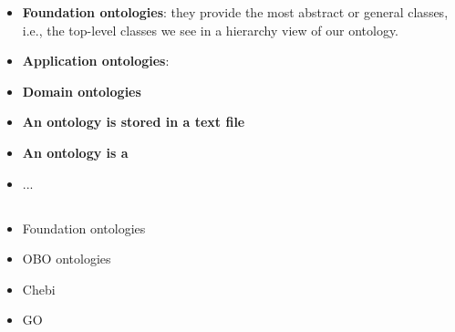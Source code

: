 \documentclass[english, xcolor=dvipsnames, aspectratio=169]{beamer}
\newcommand{\subsectiontitle}{}
\begin{document}
\begin{frame}{\subsectiontitle}
    \begin{itemize}
        \item \textbf{Foundation ontologies}: they provide the most abstract or general classes, i.e., the top-level classes we see in a hierarchy view of our ontology.
        \item \textbf{Application ontologies}:
        \item \textbf{Domain ontologies}
    \end{itemize}
\end{frame}

% 
\begin{frame}{\subsectiontitle}
    \begin{itemize}
        \item \textbf{An ontology is stored in a text file}
        \item \textbf{An ontology is a }
        \item ...
    \end{itemize}
\end{frame}

% 
\subsection{\subsectiontitle}
\begin{frame}{\subsectiontitle}
    \begin{itemize}
        \item Foundation ontologies
        \item OBO ontologies
        \item Chebi
        \item GO
    \end{itemize}
\end{frame}

% 
\renewcommand{\subsectiontitle}{What does an ontology look like? (cont)}
\end{document}
